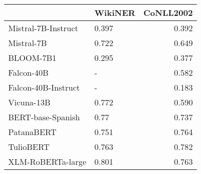 \begin{tabular}{llr}
\toprule
{} & WikiNER &  CoNLL2002 \\
\midrule
Mistral-7B-Instruct &   0.397 &      0.392 \\
Mistral-7B          &   0.722 &      0.649 \\
BLOOM-7B1           &   0.295 &      0.377 \\
Falcon-40B          &       - &      0.582 \\
Falcon-40B-Instruct &       - &      0.183 \\
Vicuna-13B          &   0.772 &      0.590 \\
BERT-base-Spanish   &    0.77 &      0.737 \\
PatanaBERT          &   0.751 &      0.764 \\
TulioBERT           &   0.763 &      0.782 \\
XLM-RoBERTa-large   &   0.801 &      0.763 \\
\bottomrule
\end{tabular}
